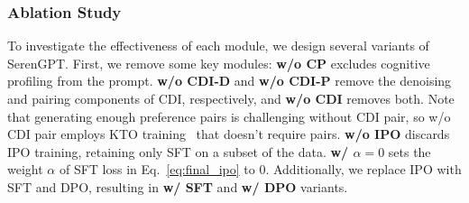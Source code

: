 \subsubsection{Ablation Study}
To investigate the effectiveness of each module, we design several variants of SerenGPT. First, we remove some key modules: \textbf{w/o CP} excludes cognitive profiling from the prompt. \textbf{w/o CDI-D} and \textbf{w/o CDI-P} remove the denoising and pairing components of CDI, respectively, and \textbf{w/o CDI} removes both. Note that generating enough preference pairs is challenging without CDI pair, so w/o CDI pair employs KTO training~\cite{ethayarajh2024kto} that doesn't require pairs. \textbf{w/o IPO} discards IPO training, retaining only SFT on a subset of the data. \textbf{w/ $\alpha=0$} sets the weight $\alpha$ of SFT loss in Eq.~\eqref{eq:final_ipo} to 0. Additionally, we replace IPO with SFT and DPO, resulting in \textbf{w/ SFT} and \textbf{w/ DPO} variants.
\begin{table}[h]

    \vspace{-5pt}
    \caption{Ablation study of SerenGPT. }
    \vspace{-8pt}
    \centering

\label{tab:Ablation}
\vspace{-5pt}
\end{table}

